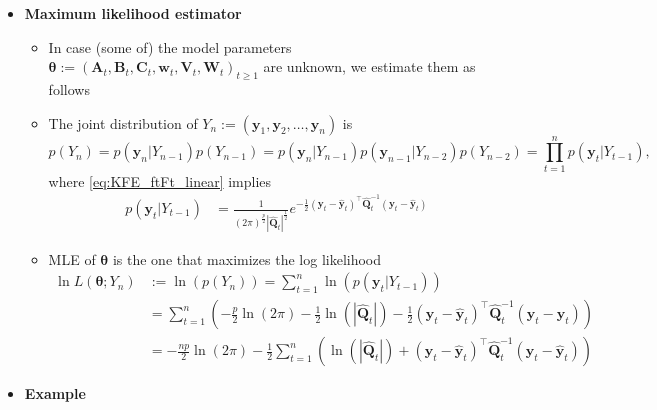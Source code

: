 \documentclass[12pt,a4paper]{article}
\begin{document}
\begin{itemize}

\item \textbf{Maximum likelihood estimator}

  \begin{itemize}

  \item In case (some of) the model parameters
    $\bm{\theta}:=(\bm{A}_{t}, \bm{B}_{t}, \bm{C}_{t}, \bm{w}_{t}, \bm{V}_{t}, \bm{W}_{t})_{t\geq 1}$ are unknown, we
    estimate them as follows

  \item The joint distribution of $Y_{n}:=(\bm{y}_{1},\bm{y}_{2},\ldots, \bm{y}_{n})$
    is
    \begin{equation}\label{eq:PYt_linear}%
      p(Y_{n})
      = p(\bm{y}_{n}|Y_{n-1})p(Y_{n-1})
      = p(\bm{y}_{n}|Y_{n-1})p(\bm{y}_{n-1}|Y_{n-2})p(Y_{n-2})
      = \prod_{t=1}^{n}p(\bm{y}_{t}|Y_{t-1}),
    \end{equation}
    where \eqref{eq:KFE_ftFt_linear} implies
    \begin{align}\label{eq:pytYt1_linear}%
      p(\bm{y}_{t}|Y_{t-1})
      & = \frac{1}{(2\pi)^{\frac{p}{2}}|\hat{\bm{Q}}_{t}|^{\frac{1}{2}}}e^{- \frac{1}{2}(\bm{y}_{t}-\hat{\bm{y}}_{t})^{\top}\hat{\bm{Q}}_{t}^{-1}(\bm{y}_{t}-\hat{\bm{y}}_{t})}
    \end{align}

  \item MLE of $\bm{\theta}$ is the one that maximizes the log likelihood
    \begin{align}
      \ln L(\bm{\theta};Y_{n})
      & := \ln \left(p(Y_{n})\right)
        = \sum_{t=1}^{n}\ln \left(p(\bm{y}_{t}|Y_{t-1})\right) \nonumber \\
      & = \sum_{t=1}^{n}\left(- \frac{p}{2}\ln(2\pi) - \frac{1}{2}\ln(|\hat{\bm{Q}}_{t}|) - \frac{1}{2}(\bm{y}_{t}-\hat{\bm{y}}_{t})^{\top}\hat{\bm{Q}}_{t}^{-1}(\bm{y}_{t}-\hat{\bm{y}}_{t})\right) \nonumber \\
      & = - \frac{np}{2}\ln(2\pi) - \frac{1}{2}\sum_{t=1}^{n}\left(\ln(|\hat{\bm{Q}}_{t}|) +(\bm{y}_{t}-\hat{\bm{y}}_{t})^{\top}\hat{\bm{Q}}_{t}^{-1}(\bm{y}_{t}-\hat{\bm{y}}_{t})\right)
        \label{eq:logL_local_linear}%
    \end{align}
    
  \end{itemize}

\item \textbf{Example}


\end{itemize}
\end{document}
